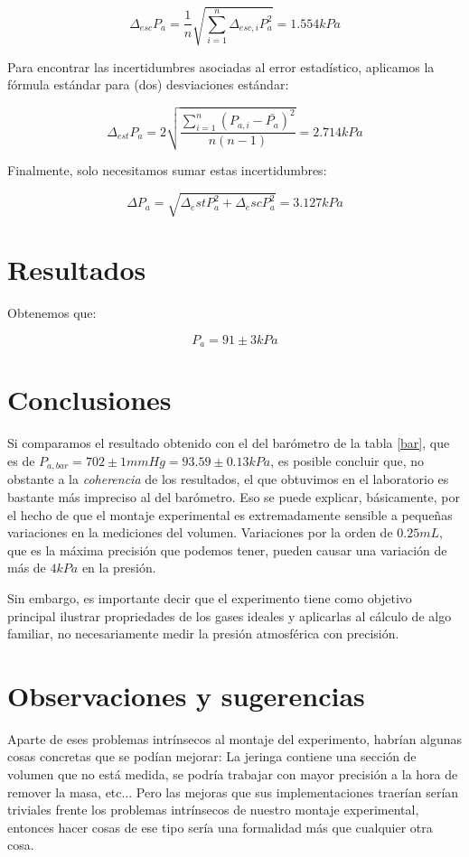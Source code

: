 \documentclass[a4paper,12pt]{article}
\begin{document}
\begin{equation}
  \Delta_{esc} P_a = \frac{1}{n}\sqrt{\sum\limits_{i=1}^n \Delta_{esc,i} P_a^2} = 1.554 kPa
\end{equation}

Para encontrar las incertidumbres asociadas al error estadístico, aplicamos la fórmula estándar para (dos) desviaciones estándar:

$$\Delta_{est} P_a = 2\sqrt{\frac{\sum\limits_{i=1}^n\left(P_{a,i}-\bar{P_a}\right)^2}{n(n-1)}} = 2.714 kPa $$

Finalmente, solo necesitamos sumar estas incertidumbres:

$$\Delta P_a = \sqrt{\Delta_est P_a^2+\Delta_esc P_a^2} = 3.127 kPa$$

\section{Resultados}
Obtenemos que:

\begin{tcolorbox}
  \begin{equation}
    P_a = 91 \pm 3 kPa
  \end{equation}
\end{tcolorbox}


\section{Conclusiones}
Si comparamos el resultado obtenido con el del barómetro de la tabla \ref{bar}, que es de $P_{a,bar} = 702 \pm 1 mmHg = 93.59 \pm 0.13 kPa$, es posible concluir que, no obstante a la \textit{coherencia} de los resultados, el que obtuvimos en el laboratorio es bastante más impreciso al del barómetro. Eso se puede explicar, básicamente, por el hecho de que el montaje experimental es extremadamente sensible a pequeñas variaciones en la mediciones del volumen. Variaciones por la orden de $0.25 mL$, que es la máxima precisión que podemos tener, pueden causar una variación de más de $4kPa$ en la presión.

Sin embargo, es importante decir que el experimento tiene como objetivo principal ilustrar propriedades de los gases ideales y aplicarlas al cálculo de algo familiar, no necesariamente medir la presión atmosférica con precisión.


\section{Observaciones y sugerencias}
Aparte de eses problemas intrínsecos al montaje del experimento, habrían algunas cosas concretas que se podían mejorar: La jeringa contiene una sección de volumen que no está medida, se podría trabajar con mayor precisión a la hora de remover la masa, etc... Pero las mejoras que sus implementaciones traerían serían triviales frente los problemas intrínsecos de nuestro montaje experimental, entonces hacer cosas de ese tipo sería una formalidad más que cualquier otra cosa.
\end{document}
